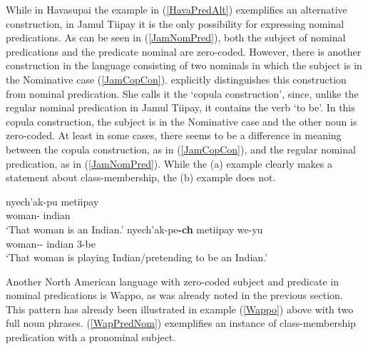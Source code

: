 
While in Havasupai the example in (\ref{HavaPredAlt}) exemplifies an alternative construction, in Jamul Tiipay it is the only possibility for expressing  nominal predications. 
As can be seen in (\ref{JamNomPred}), both the subject of nominal predications and the predicate nominal are zero-coded. 
 However, there is another construction in the language consisting of two nominals in which the subject is in the Nominative case (\ref{JamCopCon}). 
 \citet[184--185]{Miller:2001} explicitly distinguishes this construction from nominal predication. 
She calls it the `copula construction', since, unlike the regular nominal predication in Jamul Tiipay, it contains the verb `to be'. 
In this copula construction, the subject is in the Nominative case and the other noun is zero-coded. 
At least in some cases, there seems to be a difference in meaning between the copula construction, as in (\ref{JamCopCon}), and the regular nominal predication, as in (\ref{JamNomPred}). 
While the (a) example clearly makes a statement about class-membership, the (b) example does not.   
 

\begin{exe}\ex{}
\begin{xlist}
\ex\label{JamNomPred}\gll nyech'ak-pu metiipay\\
woman-\dem{} indian\\
\glt `That woman is an Indian.'
\ex\label{JamCopCon}\gll nyech'ak-pe\textbf{-ch} metiipay we-yu\\
woman-\dem{}-\nom{} indian 3-be\\
\glt `That woman is playing Indian/pretending to be an Indian.'
\end{xlist}
\end{exe}

Another North American language with zero-coded subject and predicate in nominal predications is Wappo, as was already noted in the previous section.
This pattern has already been illustrated in example (\ref{Wappo}) above with two full noun phrases.
(\ref{WapPredNom}) exemplifies an instance of class-membership predication with a pronominal subject.

